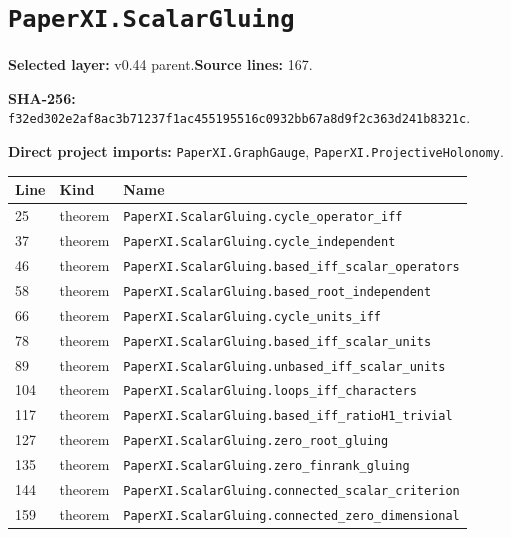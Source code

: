 \documentclass[10pt,oneside]{book}
\begin{document}
\section{\texorpdfstring{\nolinkurl{PaperXI.ScalarGluing}}{PaperXI.ScalarGluing}}\label{module:PaperXI.ScalarGluing}

\textbf{Selected layer:} v0.44 parent.\quad\textbf{Source lines:} 167.\par\textbf{SHA-256:} {\scriptsize\nolinkurl{f32ed302e2af8ac3b71237f1ac455195516c0932bb67a8d9f2c363d241b8321c}}.


\textbf{Direct project imports:} \nolinkurl{PaperXI.GraphGauge}, \nolinkurl{PaperXI.ProjectiveHolonomy}.

\begin{longtable}{@{}p{}p{}p{}@{}}\toprule Line&Kind&Name\\\midrule\endhead

25&theorem&\nolinkurl{PaperXI.ScalarGluing.cycle_operator_iff}\\

37&theorem&\nolinkurl{PaperXI.ScalarGluing.cycle_independent}\\

46&theorem&\nolinkurl{PaperXI.ScalarGluing.based_iff_scalar_operators}\\

58&theorem&\nolinkurl{PaperXI.ScalarGluing.based_root_independent}\\

66&theorem&\nolinkurl{PaperXI.ScalarGluing.cycle_units_iff}\\

78&theorem&\nolinkurl{PaperXI.ScalarGluing.based_iff_scalar_units}\\

89&theorem&\nolinkurl{PaperXI.ScalarGluing.unbased_iff_scalar_units}\\

104&theorem&\nolinkurl{PaperXI.ScalarGluing.loops_iff_characters}\\

117&theorem&\nolinkurl{PaperXI.ScalarGluing.based_iff_ratioH1_trivial}\\

127&theorem&\nolinkurl{PaperXI.ScalarGluing.zero_root_gluing}\\

135&theorem&\nolinkurl{PaperXI.ScalarGluing.zero_finrank_gluing}\\

144&theorem&\nolinkurl{PaperXI.ScalarGluing.connected_scalar_criterion}\\

159&theorem&\nolinkurl{PaperXI.ScalarGluing.connected_zero_dimensional}\\

\bottomrule\end{longtable}
\end{document}
